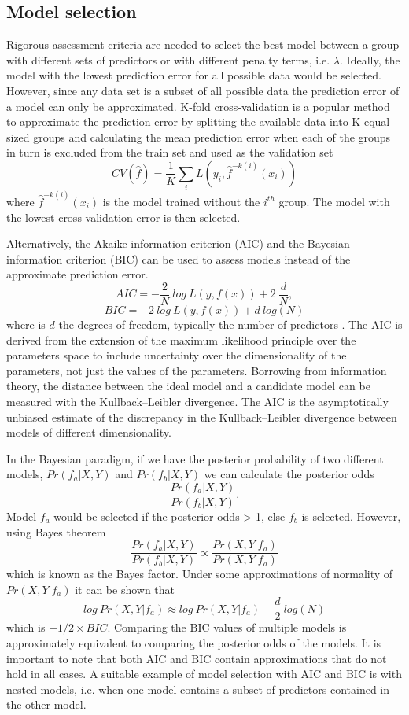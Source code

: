 \documentclass[../main.tex]{subfiles}
\begin{document}
\subsection{Model selection}

Rigorous assessment criteria are needed to select the best model between a group with different sets of predictors or with different penalty terms, i.e. $\lambda$.
Ideally, the model with the lowest prediction error for all possible data would be selected.
However, since any data set is a subset of all possible data the prediction error of a model can only be approximated.
K-fold cross-validation is a popular method to approximate the prediction error by splitting the available data into K equal-sized groups and calculating the mean prediction error when each of the groups in turn is excluded from the train set and used as the validation set
$$CV(\hat{f})=\frac{1}{K}\sum_iL(y_i,\hat{f}^{-k(i)}(x_i))$$
where $\hat{f}^{-k(i)}(x_i)$ is the model trained without the $i^{th}$ group.
The model with the lowest cross-validation error is then selected.

Alternatively, the Akaike information criterion (AIC) and the Bayesian information criterion (BIC) can be used to assess models instead of the approximate prediction error.
$$AIC = -\frac{2}{N}\ log\ L(y,f(x)) + 2\ \frac{d}{N},$$
$$BIC = -2\ log\ L(y,f(x))  + d\ log(N)$$
where is $d$ the degrees of freedom, typically the number of predictors \parencite{Schwarz1978,Akaike1971}.
The AIC is derived from the extension of the maximum likelihood principle over the parameters space to include uncertainty over the dimensionality of the parameters, not just the values of the parameters.
Borrowing from information theory, the distance between the ideal model and a candidate model can be measured with the Kullback–Leibler divergence.
The AIC is the asymptotically unbiased estimate of the discrepancy in the Kullback–Leibler divergence between models of different dimensionality.

In the Bayesian paradigm, if we have the posterior probability of two different models, $Pr(f_a|X,Y)$ and $Pr(f_b|X,Y)$ we can calculate the posterior odds 
$$\frac{Pr(f_a|X,Y)}{Pr(f_b|X,Y)}.$$
Model $f_a$ would be selected if the posterior odds > 1, else $f_b$ is selected. 
However, using Bayes theorem
$$\frac{Pr(f_a|X,Y)}{Pr(f_b|X,Y)} \propto \frac{Pr(X,Y|f_a)}{Pr(X,Y|f_a)}$$
which is known as the Bayes factor.
Under some approximations of normality of $Pr(X,Y|f_a)$ it can be shown that
$$log\ Pr(X,Y|f_a) \approx log\ Pr(X,Y|f_a) - \frac{d}{2}\ log(N)$$
which is $-1/2 \times BIC$. 
Comparing the BIC values of multiple models is approximately equivalent to comparing the posterior odds of the models.
It is important to note that both AIC and BIC contain approximations that do not hold in all cases.
A suitable example of model selection with AIC and BIC is with nested models, i.e. when one model contains a subset of predictors contained in the other model.
\end{document}
